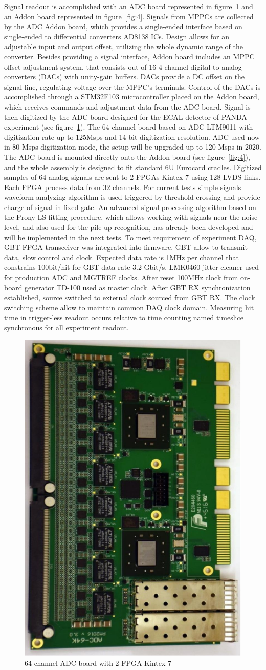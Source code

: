 \documentclass[a4paper,11pt]{article}
\begin{document}
Signal readout is accomplished with an ADC board represented in figure~\ref{fig:3} and an Addon board represented in figure~\ref{fig:4}. Signals from MPPCs are collected by the ADC Addon board, which provides a single-ended interface based on single-ended to differential converters AD8138 ICs. Design allows for an adjustable input and output offset, utilizing the whole dynamic range of the converter. Besides providing a signal interface, Addon board includes an MPPC offset adjustment system, that consists out of 16 4-channel digital to analog converters (DACs) with unity-gain buffers. DACs provide a DC offset on the signal line, regulating voltage over the MPPC's terminals. Control of the DACs is accomplished through a STM32F103 microcontroller placed on the Addon board, which receives commands and adjustment data from the ADC board. Signal is then digitized by the ADC board designed for the ECAL detector of PANDA experiment \cite{3} (see figure~\ref{fig:3}). The 64-channel board based on ADC LTM9011 with digitization rate up to 125Msps and 14-bit digitization resolution. ADC used now in 80 Msps digitization mode, the setup will be upgraded up to 120 Msps in 2020. The ADC board is mounted directly onto the Addon board (see figure~\ref{fig:4}), and the whole assembly is designed to fit standard 6U Eurocard cradles.
Digitized samples of 64 analog signals are sent to 2 FPGAs Kintex 7 using 128 LVDS links. Each FPGA process data from 32 channels. For current tests simple signals waveform analyzing algorithm is used triggered by threshold crossing and provide charge of signal in fixed gate. An advanced signal processing algorithm based on the Prony-LS fitting procedure, which allows working with signals near the noise level, and also used for the pile-up recognition, has already been developed and will be implemented in the next tests.
To meet requirement of experiment DAQ, GBT FPGA transceiver was integrated into firmware. GBT allow to transmit data, slow control and clock. Expected data rate is 1MHz per channel that constrains 100bit/hit for GBT data rate 3.2 Gbit/s. 
LMK0460 jitter cleaner used for production ADC and MGTREF clocks. After reset 100MHz clock from on-board generator TD-100 used as master clock. After GBT RX synchronization established, source switched to external clock sourced from GBT RX. The clock switching scheme allow to maintain common DAQ clock domain. Measuring hit time in trigger-less readout occurs relative to time counting named timeslice synchronous for all experiment readout.


\begin{figure}[htbp]
	\centering
	\includegraphics[width=.2\textwidth]{ADC_board.png}
	\caption{\label{fig:3} 64-channel ADC board with 2 FPGA Kintex 7}
\end{figure}
\end{document}
